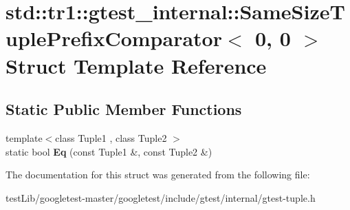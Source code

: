 \hypertarget{structstd_1_1tr1_1_1gtest__internal_1_1SameSizeTuplePrefixComparator_3_010_00_010_01_4}{}\section{std\+:\+:tr1\+:\+:gtest\+\_\+internal\+:\+:Same\+Size\+Tuple\+Prefix\+Comparator$<$ 0, 0 $>$ Struct Template Reference}
\label{structstd_1_1tr1_1_1gtest__internal_1_1SameSizeTuplePrefixComparator_3_010_00_010_01_4}
\subsection*{Static Public Member Functions}
\begin{DoxyCompactItemize}
\item 
\mbox{\label{structstd_1_1tr1_1_1gtest__internal_1_1SameSizeTuplePrefixComparator_3_010_00_010_01_4_a4f209822266c6bb1832c49750a11ef95}} 
{\footnotesize template$<$class Tuple1 , class Tuple2 $>$ }\\static bool {\bfseries Eq} (const Tuple1 \&, const Tuple2 \&)
\end{DoxyCompactItemize}


The documentation for this struct was generated from the following file\+:\begin{DoxyCompactItemize}
\item 
test\+Lib/googletest-\/master/googletest/include/gtest/internal/gtest-\/tuple.\+h\end{DoxyCompactItemize}

